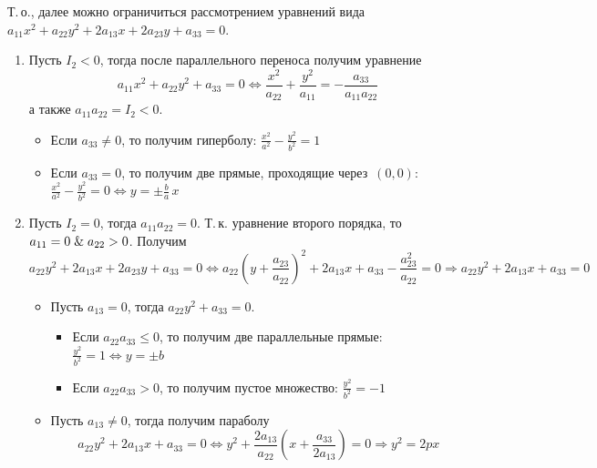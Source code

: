 Т.\,о., далее можно ограничиться рассмотрением уравнений вида $a_{11} x^2 + a_{22} y^2 + 2 a_{13} x + 2 a_{23} y + a_{33} = 0$.
\begin{enumerate}
	\item Пусть $I_2 < 0$, тогда после параллельного переноса получим уравнение
	\begin{equation*}
	a_{11} x^2 + a_{22} y^2 + a_{33} = 0 \Leftrightarrow
	\frac{x^2}{a_{22}} + \frac{y^2}{a_{11}} = -\frac{a_{33}}{a_{11} a_{22}}
	\end{equation*}
	а также $a_{11} a_{22} = I_2 < 0$.
	\begin{itemize}
		\item Если $a_{33} \neq 0$, то получим гиперболу:
		$\displaystyle \frac{x^2}{a^2} - \frac{y^2}{b^2} = 1$
		\item Если $a_{33} = 0$, то получим две прямые, проходящие через~$(0, 0)$:
		$\displaystyle \frac{x^2}{a^2} - \frac{y^2}{b^2} = 0 \Leftrightarrow
		y = \pm\frac{b}a\,x$
	\end{itemize}
	
	\item Пусть $I_2 = 0$, тогда $a_{11} a_{22} = 0$.
	Т.\,к. уравнение второго порядка, то $a_{11} = 0 \mathrel{\&} a_{22} > 0$.
	Получим
	\begin{equation*}
	a_{22} y^2 + 2 a_{13} x + 2 a_{23} y + a_{33} = 0 \Leftrightarrow
	a_{22} \left(y + \frac{a_{23}}{a_{22}}\right)^2 + 2 a_{13} x + a_{33} - \frac{a_{23}^2}{a_{22}} = 0 \Rightarrow
	a_{22} y^2 + 2 a_{13} x + a_{33} = 0
	\end{equation*}
	\begin{itemize}
		\item Пусть $a_{13} = 0$, тогда $a_{22} y^2 + a_{33} = 0$.
		\begin{itemize}
			\item Если $a_{22} a_{33} \leqslant 0$, то получим две параллельные прямые:
			$\displaystyle \frac{y^2}{b^2} = 1 \Leftrightarrow
			y = \pm b$
			\item Если $a_{22} a_{33} > 0$, то получим пустое множество:
			$\displaystyle \frac{y^2}{b^2} = -1$
		\end{itemize}
		
		\item Пусть $a_{13} \neq 0$, тогда получим параболу
		\begin{equation*}
		a_{22} y^2 + 2 a_{13} x + a_{33} = 0 \Leftrightarrow
		y^2 + \frac{2 a_{13}}{a_{22}} \left(x + \frac{a_{33}}{2 a_{13}}\right) = 0 \Rightarrow
		y^2 = 2px
		\end{equation*}
	\end{itemize}
	

\end{enumerate}

